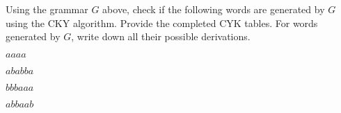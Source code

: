   Using the grammar $G$ above, check if the following words are generated
  by $G$ using the CKY algorithm. Provide the completed CYK tables.
  For words generated by $G$, write down all their
  possible derivations. 
  \begin{tightlist}
  \item $aaaa$
  \item $ababba$
  \item $bbbaaa$
  \item $abbaab$
  \end{tightlist}

